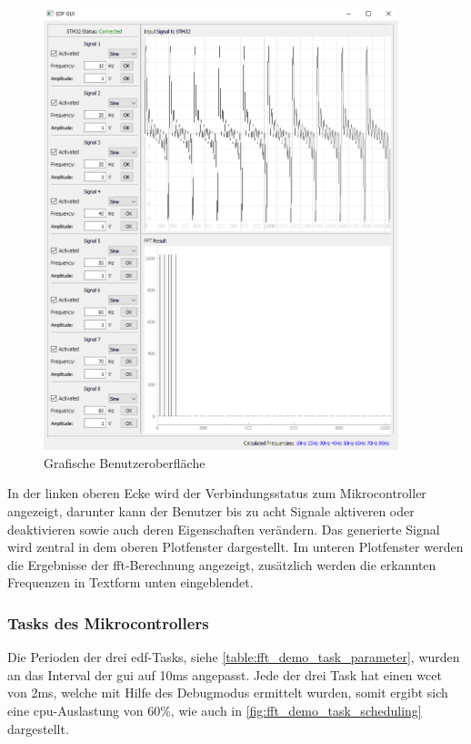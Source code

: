 \documentclass[../EDF Master Thesis.tex]{subfiles}
\begin{document}
            \begin{figure}[H]
                \centering
                \includegraphics[width=0.92\textwidth]{./attachments/gui.png}
                \caption{Grafische Benutzeroberfläche}
                \label{fig:grafische_benutzeroberflaeche}
            \end{figure}

        In der linken oberen Ecke wird der Verbindungsstatus zum Mikrocontroller angezeigt, darunter kann der Benutzer bis zu acht Signale aktiveren oder deaktivieren sowie auch deren Eigenschaften verändern.
        Das generierte Signal wird zentral in dem oberen Plotfenster dargestellt.
        Im unteren Plotfenster werden die Ergebnisse der \ac{fft}-Berechnung angezeigt, zusätzlich werden die erkannten Frequenzen in Textform unten eingeblendet.

        \subsubsection{Tasks des Mikrocontrollers}
            Die Perioden der drei \ac{edf}-Tasks, siehe \autoref{table:fft_demo_task_parameter}, wurden an das Interval der \ac{gui} auf 10ms angepasst.
            Jede der drei Task hat einen \ac{wcet} von 2ms, welche mit Hilfe des Debugmodus ermittelt wurden, somit ergibt sich eine \ac{cpu}-Auslastung von 60\%, wie auch in \autoref{fig:fft_demo_task_scheduling} dargestellt.
\end{document}
